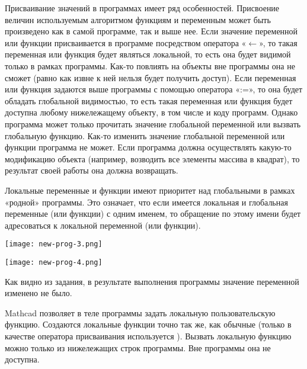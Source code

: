 Присваивание значений в программах имеет ряд особенностей. Присвоение величин используемым алгоритмом функциям и переменным может быть произведено как в самой программе, так и выше нее. Если значение переменной или функции присваивается в программе посредством оператора «$\leftarrow$», то такая переменная или функция будет являться локальной, то есть она будет видимой только в рамках программы. Как-то повлиять на объекты вне программы она не сможет (равно как извне к ней нельзя будет получить доступ). Если переменная или функция задаются выше программы с помощью оператора «:=», то она будет обладать глобальной видимостью, то есть такая переменная или функция будет доступна любому нижележащему объекту, в том числе и коду программ. Однако программа может только прочитать значение глобальной переменной или вызвать глобальную функцию. Как-то изменить значение глобальной переменной или функции программа не может. Если программа должна осуществлять какую-то модификацию объекта (например, возводить все элементы массива в квадрат), то результат своей работы она должна возвращать.

Локальные переменные и функции имеют приоритет над глобальными в рамках «родной» программы. Это означает, что если имеется локальная и глобальная переменные (или функции) с одним именем, то обращение по этому имени будет адресоваться к локальной переменной (или функции).


\begin{center}
	\texttt{[image: new-prog-3.png]}
\end{center}


\begin{center}
	\texttt{[image: new-prog-4.png]}
\end{center}

Как видно из задания, в результате выполнения программы значение переменной  изменено не было.

Mathcad позволяет в теле программы задать локальную пользовательскую функцию. Создаются локальные функции точно так же, как обычные (только в качестве оператора присваивания используется ). Вызвать локальную функцию можно только из нижележащих строк программы. Вне программы она не доступна.

